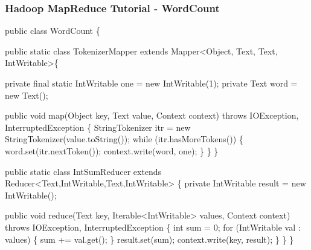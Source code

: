 \documentclass{beamer}
\begin{document}
\begin{comment}
  public static void main(String[] args) throws Exception \{
    Configuration conf = new Configuration();
    Job job = Job.getInstance(conf, ``word count'');
    job.setJarByClass(WordCount.class);
    job.setMapperClass(TokenizerMapper.class);
    job.setCombinerClass(IntSumReducer.class);
    job.setReducerClass(IntSumReducer.class);
    job.setOutputKeyClass(Text.class);
    job.setOutputValueClass(IntWritable.class);
    FileInputFormat.addInputPath(job, new Path(args[0]));
    FileOutputFormat.setOutputPath(job, new Path(args[1]));
    System.exit(job.waitForCompletion(true) ? 0 : 1);
  \}
\}
\end{semiverbatim}
\end{frame}
\end{comment}

\begin{frame}[fragile]
\frametitle{Hadoop MapReduce Tutorial - WordCount}
\begin{semiverbatim}
\tiny public class WordCount \{

  public static class TokenizerMapper
       extends Mapper<Object, Text, Text, IntWritable>\{

    private final static IntWritable one = new IntWritable(1);
    private Text word = new Text();

    public void map(Object key, Text value, Context context)
                     throws IOException, InterruptedException \{
      StringTokenizer itr = new StringTokenizer(value.toString());
      while (itr.hasMoreTokens()) \{
        word.set(itr.nextToken());
        context.write(word, one);
      \}
    \}
  \}

  public static class IntSumReducer
       extends Reducer<Text,IntWritable,Text,IntWritable> \{
    private IntWritable result = new IntWritable();

    public void reduce(Text key, Iterable<IntWritable> values, Context context)
                        throws IOException, InterruptedException \{
      int sum = 0;
      for (IntWritable val : values) \{
        sum += val.get();
      \}
      result.set(sum);
      context.write(key, result);
    \}
  \}
\}
\end{semiverbatim}
\end{frame}
\end{document}
